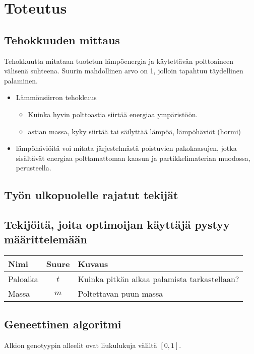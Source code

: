 \section{Toteutus}

\subsection{Tehokkuuden mittaus}
Tehokkuutta mitataan tuotetun lämpöenergia ja käytettävän polttoaineen välisenä
suhteena. Suurin mahdollinen arvo on 1, jolloin tapahtuu täydellinen palaminen.

\begin{itemize}
	\item Lämmönsiirron tehokkuus
		\begin{itemize}
			\item Kuinka hyvin polttoastia siirtää energiaa ympäristöön.
			\item astian massa, kyky siirtää tai säilyttää lämpöä, lämpöhäviöt (hormi)
		\end{itemize}
	\item lämpöhäviöitä voi mitata järjestelmästä poistuvien pakokaasujen, jotka
	sisältävät energiaa polttamattoman kaasun ja partikkelimaterian muodossa, perusteella.
\end{itemize}

\subsection{Työn ulkopuolelle rajatut tekijät}

\subsection{Tekijöitä, joita optimoijan käyttäjä pystyy määrittelemään}
\begin{tabular*}{\textwidth}{lcl}
	\toprule
	\bf Nimi & \bf Suure & \bf Kuvaus \\
	\midrule
	Paloaika & \(t\) & Kuinka pitkän aikaa palamista tarkastellaan? \\
	Massa & \(m\) & Poltettavan puun massa \\
	\bottomrule
\end{tabular*}

\subsection{Geneettinen algoritmi}
Alkion genotyypin alleelit ovat liukulukuja väliltä \([0, 1]\).

